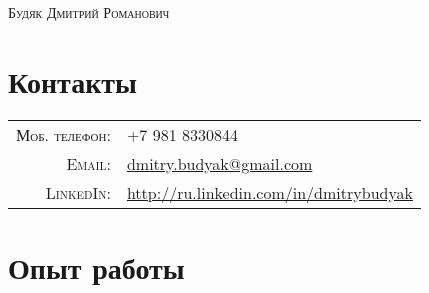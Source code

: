 \documentclass[a4paper,10pt]{article}
\begin{document}
\par{\centering
	\Large \textsc{Будяк Дмитрий Романович}
	}
\newline
\section{Контакты}
	\begin{tabular}{rl}
	\textsc{Моб. телефон:}     & +7 981 8330844 \\
	\textsc{Email:}     & \href{mailto:dmitry.budyak@gmail.com}{dmitry.budyak@gmail.com} \\
	\textsc{LinkedIn:} & \href{http://ru.linkedin.com/in/dmitrybudyak}{http://ru.linkedin.com/in/dmitrybudyak}
	\end{tabular}

\section{Опыт работы}
\end{document}
